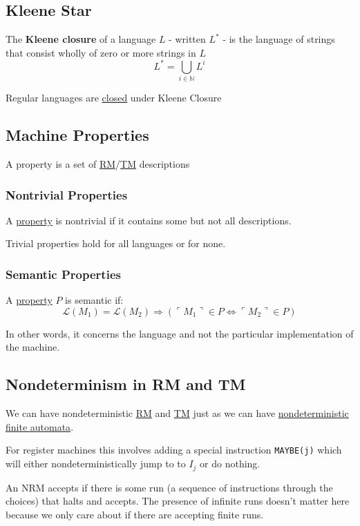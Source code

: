 \documentclass{article}
\begin{document}
\subsection{Kleene Star}\label{kleene-star}
The \textbf{Kleene closure} of a language $L$ - written $L^*$ - is the language of strings that consist wholly of zero or more strings in $L$
\[L^*=\bigcup_{i \in \mathbb{N}} L^i\]

Regular languages are \hyperref[closure]{closed} under Kleene Closure


\subsection{Machine Properties}\label{property}
A property is a set of \hyperref[rm]{RM}/\hyperref[tm]{TM} descriptions

\subsubsection{Nontrivial Properties}\label{nontrivial}
A \hyperref[property]{property} is nontrivial if it contains some but not all descriptions.

Trivial properties hold for all languages or for none.

\subsubsection{Semantic Properties}\label{semantic}
A \hyperref[property]{property} $P$ is semantic if:
\[\mathcal{L}(M_1) = \mathcal{L}(M_2) \Rightarrow (\ulcorner M_1 \urcorner \in P \Leftrightarrow \ulcorner M_2 \urcorner \in P)\]

In other words, it concerns the language and not the particular implementation of the machine.


\subsection{Nondeterminism in RM and TM}\label{nrm}\label{ntm}
We can have nondeterministic \hyperref[rm]{RM} and \hyperref[tm]{TM} just as we can have \hyperref[nfa]{nondeterministic finite automata}.

For register machines this involves adding a special instruction \texttt{MAYBE(j)} which will either nondeterministically jump to to $I_j$ or do nothing.

An NRM accepts if there is some run (a sequence of instructions through the choices) that halts and accepts. The presence of infinite runs doesn't matter here because we only care about if there are accepting finite runs.
\end{document}
